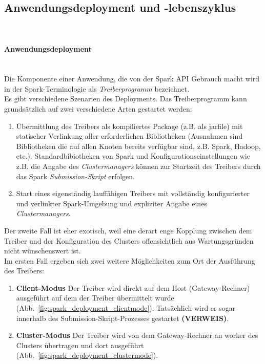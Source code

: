 \subsection{Anwendungsdeployment und -lebenszyklus}\\

\paragraph{Anwendungsdeployment}\\

Die Komponente einer Anwendung, die von der Spark API Gebrauch macht wird in der Spark-Terminologie als \textit{Treiberprogramm} bezeichnet. \\

Es gibt verschiedene Szenarien des Deployments. Das Treiberprogramm kann grundsätzlich auf zwei verschiedene Arten gestartet werden:\\

\begin{enumerate}
	\item Übermittlung des Treibers als kompiliertes Package (z.B. als \gls{jarfile}) mit statischer Verlinkung aller erforderlichen Bibliotheken (Ausnahmen sind Bibliotheken die auf allen Knoten bereits verfügbar sind, z.B. Spark, Hadoop, etc.). Standardbibiotheken von Spark und Konfigurationseinstellungen wie z.B. die Angabe des \textit{Clustermanagers} können zur Startzeit des Treibers durch das Spark \textit{Submission-Skript} erfolgen.
	\item Start eines eigenständig lauffähigen Treibers mit vollständig konfigurierter und verlinkter Spark-Umgebung und expliziter Angabe eines \textit{Clustermanagers}.
\end{enumerate}

Der zweite Fall ist eher exotisch, weil eine derart enge Kopplung zwischen dem Treiber und der Konfiguration des Clusters offensichtlich aus Wartungsgründen nicht wünschenswert ist.\\

Im ersten Fall ergeben sich zwei weitere Möglichkeiten zum Ort der Ausführung des Treibers:\\

\begin{enumerate}
	\item \textbf{Client-Modus}	Der Treiber wird direkt auf dem Host (Gateway-Rechner) ausgeführt auf dem der Treiber übermittelt wurde (Abb.~\ref{fig:spark_deployment_clientmode}). Tatsächlich wird er sogar innerhalb des Submission-Skript-Prozesses gestartet \textbf{(VERWEIS)}.
	\item \textbf{Cluster-Modus}	Der Treiber wird von dem Gateway-Rechner an \gls{worker} des Clusters übertragen und dort ausgeführt (Abb.~\ref{fig:spark_deployment_clustermode}).
\end{enumerate}\\

